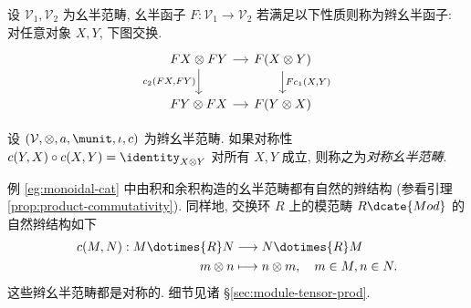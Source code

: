 \begin{definition}
	设 $\mathcal{V}_1, \mathcal{V}_2$ 为幺半范畴, 幺半函子 $F: \mathcal{V}_1 \to \mathcal{V}_2$ 若满足以下性质则称为辫幺半函子: 对任意对象 $X, Y$, 下图交换.
	\[ \begin{tikzcd}[column sep=small]
		FX \otimes FY \arrow[r] \arrow[d, "{c_2(FX, FY)}"'] & F(X \otimes Y) \arrow[d, "{Fc_1(X, Y)}"] \\
		FY \otimes FX \arrow[r] & F(Y \otimes X)
	\end{tikzcd} \]
\end{definition}

\begin{definition}\label{def:symm-monoidal-cat}
	设 $(\mathcal{V}, \otimes, a, \munit, \iota, c)$ 为辫幺半范畴. 如果对称性 $c(Y,X) \circ c(X, Y) = \identity_{X \otimes Y}$ 对所有 $X, Y$ 成立, 则称之为\emph{对称幺半范畴}.
\end{definition}

\begin{example}
	例 \ref{eg:monoidal-cat} 中由积和余积构造的幺半范畴都有自然的辫结构 (参看引理 \ref{prop:product-commutativity}). 同样地, 交换环 $R$ 上的模范畴 $R\dcate{Mod}$ 的自然辫结构如下
	\begin{align*}
		c(M, N): M \dotimes{R} N & \longrightarrow N \dotimes{R} M \\
		m \otimes n & \longmapsto n \otimes m, \quad m \in M, n \in N.
	\end{align*}
	这些辫幺半范畴都是对称的. 细节见诸 \S\ref{sec:module-tensor-prod}.
\end{example}

